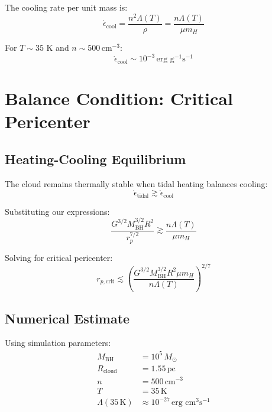 \documentclass[12pt,a4paper]{article}
\begin{document}
The cooling rate per unit mass is:
\begin{equation}
    \dot{\epsilon}_{\text{cool}} = \frac{n^2 \Lambda(T)}{\rho} = \frac{n \Lambda(T)}{\mu m_H}
\end{equation}

For $T \sim 35$ K and $n \sim 500 \, \text{cm}^{-3}$:
\begin{equation}
    \dot{\epsilon}_{\text{cool}} \sim 10^{-3} \, \text{erg g}^{-1} \text{s}^{-1}
\end{equation}

\section{Balance Condition: Critical Pericenter}

\subsection{Heating-Cooling Equilibrium}

The cloud remains thermally stable when tidal heating balances cooling:
\begin{equation}
    \dot{\epsilon}_{\text{tidal}} \gtrsim \dot{\epsilon}_{\text{cool}}
\end{equation}

Substituting our expressions:
\begin{equation}
    \frac{G^{3/2} M_{\text{BH}}^{3/2} R^2}{r_p^{7/2}} \gtrsim \frac{n \Lambda(T)}{\mu m_H}
\end{equation}

Solving for critical pericenter:
\begin{equation}
    \boxed{r_{p,\text{crit}} \lesssim \left(\frac{G^{3/2} M_{\text{BH}}^{3/2} R^2 \mu m_H}{n \Lambda(T)}\right)^{2/7}}
\end{equation}

\subsection{Numerical Estimate}

Using simulation parameters:
\begin{align}
    M_{\text{BH}} &= 10^5 \, M_\odot \\
    R_{\text{cloud}} &= 1.55 \, \text{pc} \\
    n &= 500 \, \text{cm}^{-3} \\
    T &= 35 \, \text{K} \\
    \Lambda(35 \, \text{K}) &\approx 10^{-27} \, \text{erg cm}^3 \text{s}^{-1}
\end{align}
\end{document}

